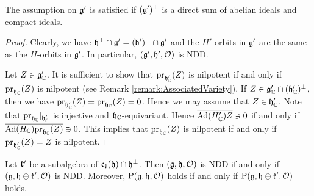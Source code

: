 \begin{remark}
	The assumption on $\mathfrak{g'}$ is satisfied if $(\mathfrak{g'})^\perp$ is a direct sum of abelian ideals and compact ideals.
\end{remark}

\begin{proof}
	Clearly, we have $\mathfrak{h}^\perp \cap \mathfrak{g'} = (\mathfrak{h'})^\perp \cap \mathfrak{g'}$
	and the $H'$-orbits in $\mathfrak{g'}$ are the same as the $H$-orbits in $\mathfrak{g'}$.
	In particular, $(\mathfrak{g'}, \mathfrak{h'}, \mathcal{O})$ is NDD.

	Let $Z \in \mathfrak{g}_{\mathbb{C}}'$.
	It is sufficient to show that $\mathrm{pr}_{\mathfrak{h}_{\mathbb{C}}'}(Z)$ is nilpotent if and only if $\mathrm{pr}_{\mathfrak{h}_{\mathbb{C}}}(Z)$ is nilpotent (see Remark \ref{remark:AssociatedVariety}).
	If $Z \in \mathfrak{g}_{\mathbb{C}}'\cap (\mathfrak{h}_{\mathbb{C}}')^\perp$, then we have $\mathrm{pr}_{\mathfrak{h}_{\mathbb{C}}'}(Z) = \mathrm{pr}_{\mathfrak{h}_{\mathbb{C}}}(Z) = 0$.
	Hence we may assume that $Z \in \mathfrak{h}_{\mathbb{C}}'$.
	Note that $\mathrm{pr}_{\mathfrak{h}_{\mathbb{C}}}|_{\mathfrak{h}_{\mathbb{C}}'}$ is injective and $\mathfrak{h}_{\mathbb{C}}$-equivariant.
	Hence $\overline{\mathrm{Ad}(H'_{\mathbb{C}})Z} \ni 0$ if and only if $\overline{\mathrm{Ad}(H_{\mathbb{C}})\mathrm{pr}_{\mathfrak{h}_{\mathbb{C}}}(Z)} \ni 0$.
	This implies that $\mathrm{pr}_{\mathfrak{h}_{\mathbb{C}}}(Z)$ is nilpotent if and only if $\mathrm{pr}_{\mathfrak{h}_{\mathbb{C}}'}(Z) = Z$ is nilpotent.
\end{proof}


\begin{lemma} \label{lem:ReductionCompactFactor}
	Let $\mathfrak{k'}$ be a subalgebra of $\mathfrak{c}_{\mathfrak{k}}(\mathfrak{h}) \cap \mathfrak{h}^\perp$.
	Then $(\mathfrak{g}, \mathfrak{h}, \mathcal{O})$ is NDD if and only if $(\mathfrak{g}, \mathfrak{h} \oplus \mathfrak{k'}, \mathcal{O})$ is NDD.
	Moreover, $\mathrm{P}(\mathfrak{g}, \mathfrak{h}, \mathcal{O})$ holds if and only if $\mathrm{P}(\mathfrak{g}, \mathfrak{h} \oplus \mathfrak{k'}, \mathcal{O})$ holds.
\end{lemma}

